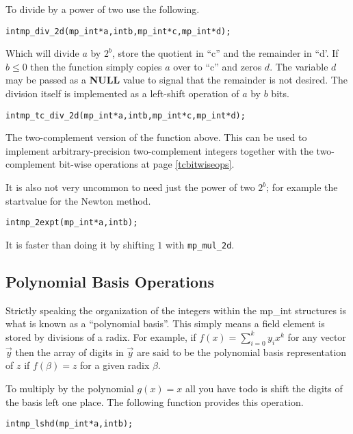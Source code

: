 \documentclass[synpaper]{book}
\begin{document}
To divide by a power of two use the following.

\begin{alltt}
int mp_div_2d (mp_int * a, int b, mp_int * c, mp_int * d);
\end{alltt}
Which will divide $a$ by $2^b$, store the quotient in ``c'' and the remainder in ``d'.  If $b \le 0$ then the
function simply copies $a$ over to ``c'' and zeros $d$.  The variable $d$ may be passed as a \textbf{NULL}
value to signal that the remainder is not desired.  The division itself is implemented as a left-shift
operation of $a$ by $b$ bits.

\label{arithrightshift}
\begin{alltt}
int mp_tc_div_2d (mp_int * a, int b, mp_int * c, mp_int * d);
\end{alltt}
The two-complement version of the function above. This can be used to implement arbitrary-precision two-complement integers together with the two-complement bit-wise operations at page \ref{tcbitwiseops}.


It is also not very uncommon to need just the power of two $2^b$;  for example the startvalue for the Newton method.

\begin{alltt}
int mp_2expt(mp_int *a, int b);
\end{alltt}
It is faster than doing it by shifting $1$ with \texttt{mp\_mul\_2d}.

\subsection{Polynomial Basis Operations}

Strictly speaking the organization of the integers within the mp\_int structures is what is known as a
``polynomial basis''.  This simply means a field element is stored by divisions of a radix.  For example, if
$f(x) = \sum_{i=0}^{k} y_ix^k$ for any vector $\vec y$ then the array of digits in $\vec y$ are said to be
the polynomial basis representation of $z$ if $f(\beta) = z$ for a given radix $\beta$.

To multiply by the polynomial $g(x) = x$ all you have todo is shift the digits of the basis left one place.  The
following function provides this operation.

\begin{alltt}
int mp_lshd (mp_int * a, int b);
\end{alltt}
\end{document}
